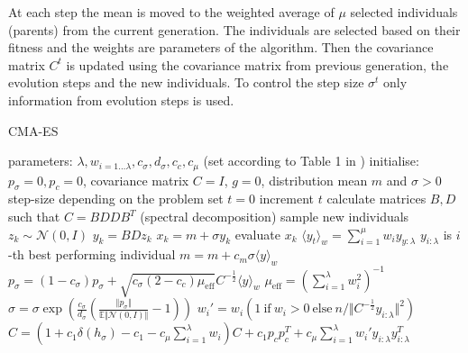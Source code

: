 At each step the mean is moved to the weighted average of $\mu$ selected individuals (parents) from the current generation. The individuals are selected based on their fitness and the weights are parameters of the algorithm. Then the covariance matrix $C^t$ is updated using the covariance matrix from previous generation, the evolution steps and the new individuals. To control the step size $\sigma^t$ only information from evolution steps is used.

\begin{algorithm}[h]
    \begin{algorithmic}[1]
    \caption{CMA-ES}
    \label{alg:cma-es}
        \State parameters: $\lambda, w_{i=1\dots\lambda}, c_\sigma,d_\sigma, c_c, c_\mu$ (set according to Table 1 in \cite{hansen2016cma})
        \State initialise: $p_\sigma=0,p_c=0$, covariance matrix $C=I$, $g=0$, distribution mean $m$ and $\sigma > 0$ step-size depending on the problem
        \State set $t=0$
        \Repeat
            \State increment $t$
            \State calculate matrices $B,D$ such that $C=BDDB^T$ (spectral decomposition)
            \Comment sample new individuals
                \State $z_k \sim \mathcal{N}(0,I)$
                \State $y_k = BDz_k$
                \State $x_k = m+\sigma y_k$
                \State evaluate $x_k$
            \EndFor
            \State $\langle y_t\rangle_w = \sum_{i=1}^\mu w_i y_{y:\lambda} $ \Comment $y_{i:\lambda}$ is $i$-th best performing individual
            \State $m = m+c_m \sigma \langle y\rangle_w$
            \State $p_\sigma = (1-c_\sigma)p_\sigma + \sqrt{c_\sigma (2-c_c)\mu_{\text{eff}}}C^{-\frac{1}{2}}\langle y \rangle_w$ \Comment $\mu_{\text{eff}}=(\sum_{i=1}^\lambda w_i^2)^{-1}$
            \State $\sigma = \sigma \exp(\frac{c_\sigma}{d_\sigma}(\frac{\Vert p_\sigma\Vert}{\mathbb{E}\Vert\mathcal{N}(0,I)\Vert}-1))$
            \State $w_i' = w_i(1\ \text{if}\ w_i> 0\ \text{else}\ n/ \Vert C^{-\frac{1}{2}}y_{i:\lambda}\Vert^2)$
            \State $C = (1+c_1\delta(h_\sigma)-c_1-c_\mu\sum_{i=1}^\lambda w_i)C + c_1p_cp_c^T + c_\mu\sum_{i=1}^\lambda w_i'y_{i:\lambda}y_{i:\lambda}^T$
    \end{algorithmic}
    \end{algorithm}
